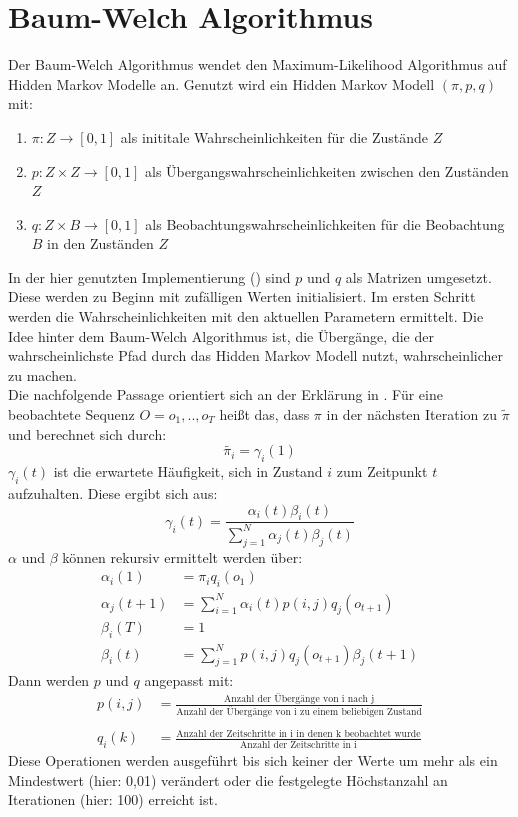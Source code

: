 \documentclass{article}
\begin{document}
\section{Baum-Welch Algorithmus}
\label{sec:BaumWelch}
Der Baum-Welch Algorithmus wendet den Maximum-Likelihood Algorithmus auf Hidden Markov Modelle an.
Genutzt wird ein Hidden Markov Modell $(\pi, p, q)$ mit:
\begin{enumerate}
\item $\pi: Z \rightarrow [0,1]$ als inititale Wahrscheinlichkeiten für die Zustände $Z$
\item $p: Z \times Z \rightarrow [0,1]$ als Übergangswahrscheinlichkeiten zwischen den Zuständen $Z$
\item $q: Z \times B \rightarrow [0,1]$ als Beobachtungswahrscheinlichkeiten für die Beobachtung $B$ in den Zuständen $Z$
\end{enumerate}
In der hier genutzten Implementierung (\cite{HmmlearnHmmlearn2021}) sind $p$ und $q$ als Matrizen umgesetzt.
Diese werden zu Beginn mit zufälligen Werten initialisiert.
Im ersten Schritt werden die Wahrscheinlichkeiten mit den aktuellen Parametern ermittelt.
Die Idee hinter dem Baum-Welch Algorithmus ist, die Übergänge, die der wahrscheinlichste Pfad durch das Hidden Markov Modell nutzt, wahrscheinlicher zu machen.\\
Die nachfolgende Passage orientiert sich an der Erklärung in \cite{wunschBaumWelchAlgorithmusFu2001}.
Für eine beobachtete Sequenz $O = {o_1, .., o_T}$ heißt das, dass $\pi$ in der nächsten Iteration zu $\tilde{\pi}$ und berechnet sich durch:
\[
\tilde{\pi_i} = \gamma_i(1)
\]
$\gamma_i(t)$ ist die erwartete Häufigkeit, sich in Zustand $i$ zum Zeitpunkt $t$ aufzuhalten.
Diese ergibt sich aus:
\[
\gamma_i(t) = \frac{\alpha_i(t)\beta_i(t)}{\sum_{j=1}^{N}\alpha_j(t)\beta_j(t)}
\]
$\alpha$ und $\beta$ können rekursiv ermittelt werden über:
\begin{align*}
\alpha_i(1) &= \pi_iq_i(o_1) \\
\alpha_j(t+1) &= \sum_{i=1}^{N}\alpha_i(t)p(i, j)q_j(o_{t+1})\\
\beta_i(T) &= 1 \\
\beta_i(t) &= \sum_{j=1}^{N}p(i, j)q_j(o_{t+1})\beta_j(t+1)
\end{align*}
Dann werden $p$ und $q$ angepasst mit:
\begin{align*}
p(i, j) &= \frac{\text{Anzahl der Übergänge von i nach j}}{\text{Anzahl der Übergänge von i zu einem beliebigen Zustand}}\\
\\
q_i(k) &= \frac{\text{Anzahl der Zeitschritte in i in denen k beobachtet wurde}}{\text{Anzahl der Zeitschritte in i}}
\end{align*}
Diese Operationen werden ausgeführt bis sich keiner der Werte um mehr als ein Mindestwert (hier: 0,01) verändert oder die festgelegte Höchstanzahl an Iterationen (hier: 100) erreicht ist.
\end{document}
